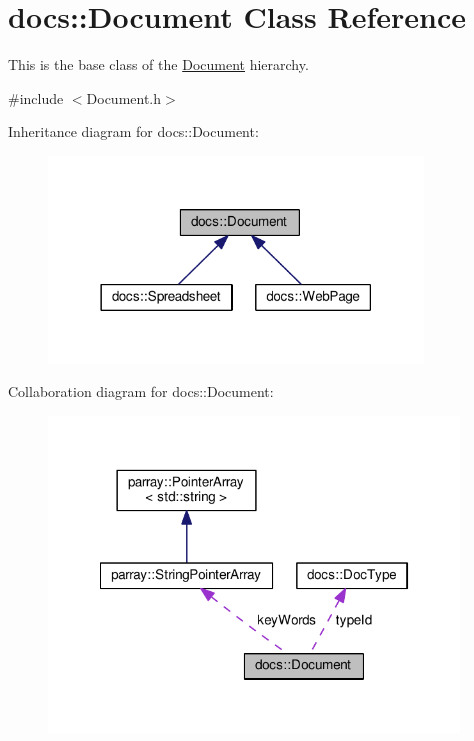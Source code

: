 \hypertarget{classdocs_1_1Document}{\section{docs\-:\-:Document Class Reference}
\label{classdocs_1_1Document}
}


This is the base class of the \hyperlink{classdocs_1_1Document}{Document} hierarchy.  




{\ttfamily \#include $<$Document.\-h$>$}



Inheritance diagram for docs\-:\-:Document\-:\nopagebreak
\begin{figure}[H]
\begin{center}
\leavevmode
\includegraphics[width=282pt]{classdocs_1_1Document__inherit__graph}
\end{center}
\end{figure}


Collaboration diagram for docs\-:\-:Document\-:\nopagebreak
\begin{figure}[H]
\begin{center}
\leavevmode
\includegraphics[width=309pt]{classdocs_1_1Document__coll__graph}
\end{center}
\end{figure}
